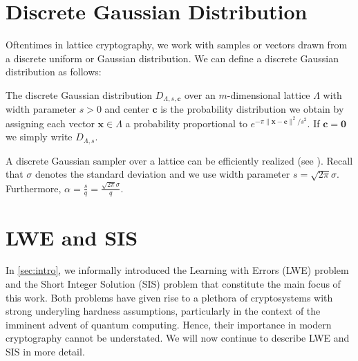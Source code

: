 





\section{Discrete Gaussian Distribution}


Oftentimes in lattice cryptography, we work with samples or vectors drawn from a discrete uniform or Gaussian distribution. We can define a discrete Gaussian distribution as follows:
\begin{definition}
    The discrete Gaussian distribution $D_{\Lambda, s, \mathbf{c}}$ over an $m$-dimensional lattice $\Lambda$ with width parameter $s > 0$ and center $\mathbf{c}$ is the probability distribution we obtain by assigning each vector $\mathbf{x}\in \Lambda$ a probability proportional to $e^{-\pi \|\mathbf{x} - \mathbf{c}\|^2/s^2}$. If $\mathbf{c} = \mathbf{0}$ we simply write  $D_{\Lambda, s}$.
\end{definition}
A discrete Gaussian sampler over a lattice can be efficiently realized (see \cite{GPV08}). Recall that $\sigma$ denotes the standard deviation and we use width parameter $s = \sqrt{2 \pi} \sigma$. Furthermore, $\alpha = \frac{s}{q} = \frac{\sqrt{2\pi} \sigma}{q}$.









\section{LWE and SIS}\label{sec:problems}
In \cref{sec:intro}, we informally introduced the Learning with Errors (LWE) problem and the Short Integer Solution (SIS) problem that constitute the main focus of this work. Both problems have given rise to a plethora of cryptosystems with strong underyling hardness assumptions, particularly in the context of the imminent advent of quantum computing. Hence, their importance in modern cryptography cannot be understated. We will now continue to describe LWE and SIS in more detail.

